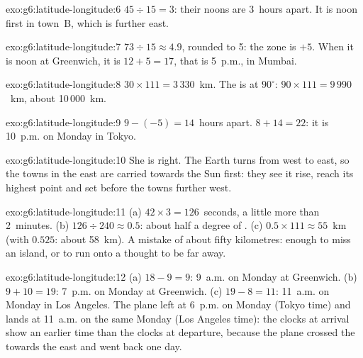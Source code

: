 \begin{solution}{exo:g6:latitude-longitude:6}
$45 \div 15 = 3$: their noons are 3~hours apart. It is noon first in
town~B, which is further east.
\end{solution}

\begin{solution}{exo:g6:latitude-longitude:7}
$73 \div 15 \approx 4.9$, rounded to 5: the zone is $+5$. When it is noon
at Greenwich, it is $12 + 5 = 17$, that is 5~p.m., in Mumbai.
\end{solution}

\begin{solution}{exo:g6:latitude-longitude:8}
$30 \times 111 = 3\,330$~km. The  is at $90^\circ$:
$90 \times 111 = 9\,990$~km, about 10\,000~km.
\end{solution}

\begin{solution}{exo:g6:latitude-longitude:9}
$9 - (-5) = 14$~hours apart. $8 + 14 = 22$: it is 10~p.m. on Monday in
Tokyo.
\end{solution}

\begin{solution}{exo:g6:latitude-longitude:10}
She is right. The Earth turns from west to east, so the towns in the east
are carried towards the Sun first: they see it rise, reach its highest
point and set before the towns further west.
\end{solution}

\begin{solution}{exo:g6:latitude-longitude:11}
(a) $42 \times 3 = 126$~seconds, a little more than 2~minutes. (b)
$126 \div 240 \approx 0.5$: about half a degree of . (c)
$0.5 \times 111 \approx 55$~km (with $0.525$: about 58~km). A mistake of
about fifty kilometres: enough to miss an island, or to run onto a 
thought to be far away.
\end{solution}

\begin{solution}{exo:g6:latitude-longitude:12}
(a) $18 - 9 = 9$: 9~a.m. on Monday at Greenwich. (b) $9 + 10 = 19$:
7~p.m. on Monday at Greenwich. (c) $19 - 8 = 11$: 11~a.m. on Monday in Los
Angeles. The plane left at 6~p.m. on Monday (Tokyo time) and lands at
11~a.m. on the same Monday (Los Angeles time): the clocks at arrival show an
earlier time than the clocks at departure, because the plane crossed the
 towards the east and went back one day.
\end{solution}

